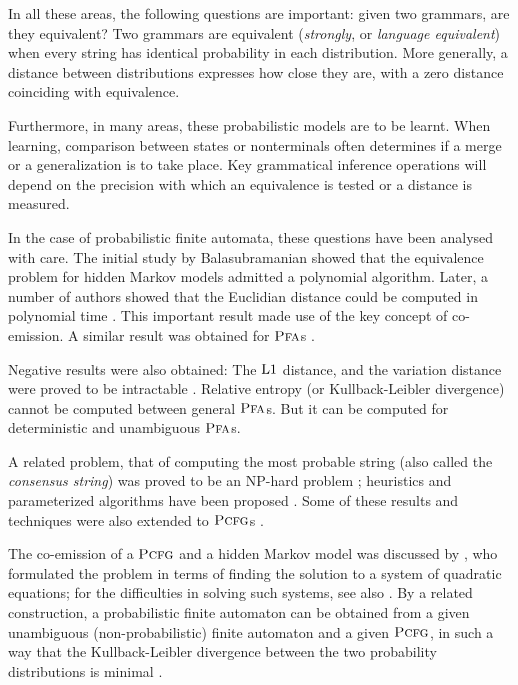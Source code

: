 \documentclass[submission]{eptcs} \usepackage{breakurl}             \usepackage[english]{babel}
\providecommand{\Lone}{\textup{L1}}
\providecommand{\PCFG}{\ensuremath{\textsc{Pcfg}}}
\providecommand{\PFA}{\ensuremath{\textsc{Pfa}}}
\begin{document}
In all these areas, the following questions are important: given two grammars, are they equivalent? Two grammars are equivalent (\emph{strongly}, or \emph{language equivalent}) when every string has identical probability in each distribution. More generally, a distance between distributions expresses how close they are, with a zero distance coinciding with equivalence.

Furthermore, in many areas, these probabilistic models are to be learnt. When learning, comparison between states or nonterminals often determines if a merge or a generalization is to take place.  Key grammatical inference operations \cite{higu10} will depend on the precision with which an equivalence is tested or a distance is measured.

In the case of probabilistic finite automata, these questions have been analysed with care. The initial study by Balasubramanian \cite{bala93} showed that the equivalence problem for hidden Markov models admitted a polynomial algorithm. Later, a number of authors showed that the Euclidian distance could be computed in polynomial time \cite{lyng99}.  This important result made use of the key concept of co-emission. A similar result was obtained for $\PFA$s \cite{murg04}. 

Negative results were also obtained: The $\Lone$ distance, and the variation distance were proved to be intractable \cite{lyng01}.
Relative entropy (or Kullback-Leibler divergence) cannot be computed between general $\PFA$s. But it can be computed for deterministic \cite{carr97} and unambiguous \cite{cort08} $\PFA$s.

A related problem, that of computing the most probable string (also called the \emph{consensus string}) was proved to be an NP-hard problem \cite{casa00a,lyng02};  heuristics and parameterized algorithms have been proposed \cite{higu13b}. Some of these results and techniques were also extended to $\PCFG$s \cite{higu13a}.

The co-emission of a $\PCFG$ and a hidden Markov model was discussed by \cite{jago01}, who formulated the problem in terms of finding the solution to a system of quadratic equations; for the difficulties in solving such systems, see also \cite{etessami2009}.
By a related construction, a probabilistic finite automaton can be obtained from a given unambiguous (non-probabilistic) finite automaton and a given $\PCFG$, in such a way that the Kullback-Leibler divergence between the two probability distributions is minimal \cite{nede04}.
\end{document}
